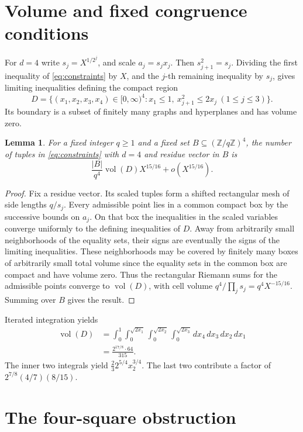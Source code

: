 \documentclass[11pt]{article}
\newtheorem{lemma}[theorem]{Lemma}
\begin{document}
\section{Volume and fixed congruence conditions}

For \(d=4\) write \(s_j=X^{1/2^j}\), and scale \(a_j=s_jx_j\). Then \(s_{j+1}^2=s_j\). Dividing the first inequality of \eqref{eq:constraints} by \(X\), and the \(j\)-th remaining inequality by \(s_j\), gives limiting inequalities defining the compact region
\[
 D=\{(x_1,x_2,x_3,x_4)\in [0,\infty)^4:
          x_1\le1,\ x_{j+1}^2\le 2x_j\ (1\le j\le3)\}.
\]
Its boundary is a subset of finitely many graphs and hyperplanes and has volume zero.

\begin{lemma}\label{lem:lattice}
For a fixed integer \(q\ge1\) and a fixed set \(B\subseteq(\mathbb Z/q\mathbb Z)^4\), the number of tuples in \eqref{eq:constraints} with \(d=4\) and residue vector in \(B\) is
\[
 \frac{|B|}{q^4}\operatorname{vol}(D)X^{15/16}+o(X^{15/16}).
\]
\end{lemma}

\begin{proof}
Fix a residue vector. Its scaled tuples form a shifted rectangular mesh of side lengths \(q/s_j\). Every admissible point lies in a common compact box by the successive bounds on \(a_j\). On that box the inequalities in the scaled variables converge uniformly to the defining inequalities of \(D\). Away from arbitrarily small neighborhoods of the equality sets, their signs are eventually the signs of the limiting inequalities. These neighborhoods may be covered by finitely many boxes of arbitrarily small total volume since the equality sets in the common box are compact and have volume zero. Thus the rectangular Riemann sums for the admissible points converge to \(\operatorname{vol}(D)\), with cell volume \(q^4/\prod_j s_j=q^4X^{-15/16}\). Summing over \(B\) gives the result.
\end{proof}

Iterated integration yields
\begin{align*}
 \operatorname{vol}(D)
 &=\int_0^1 \int_0^{\sqrt{2x_1}}\int_0^{\sqrt{2x_2}}
            \int_0^{\sqrt{2x_3}} dx_4\,dx_3\,dx_2\,dx_1\\
 &=\frac{2^{17/8}\cdot64}{315}.
\end{align*}
The inner two integrals yield \(\frac{2}{3}2^{5/4}x_2^{3/4}\). The last two contribute a factor of \(2^{7/8}(4/7)(8/15)\).

\section{The four-square obstruction}
\end{document}
